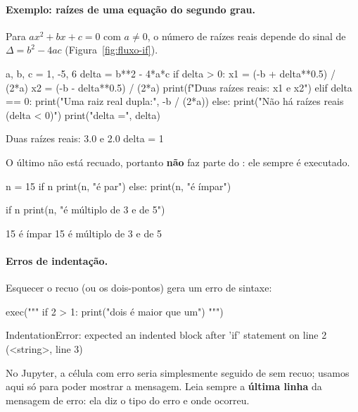 {{\paragraph{Exemplo: raízes de uma equação do segundo grau.} Para $ax^2+bx+c=0$ com $a\neq 0$, o número de raízes
reais depende do sinal de $\Delta=b^2-4ac$ (Figura~\ref{fig:fluxo-if}).

\begin{entrada}
a, b, c = 1, -5, 6
delta = b**2 - 4*a*c
if delta > 0:
    x1 = (-b + delta**0.5) / (2*a)
    x2 = (-b - delta**0.5) / (2*a)
    print(f"Duas raízes reais: {x1} e {x2}")
elif delta == 0:
    print("Uma raiz real dupla:", -b / (2*a))
else:
    print("Não há raízes reais (delta < 0)")
print("delta =", delta)
\end{entrada}
\begin{saida}
Duas raízes reais: 3.0 e 2.0
delta = 1
\end{saida}

O último  não está recuado, portanto \textbf{não} faz parte do : ele sempre é executado.

\begin{entrada}
n = 15
if n %
    print(n, "é par")
else:
    print(n, "é ímpar")

if n %
    print(n, "é múltiplo de 3 e de 5")
\end{entrada}
\begin{saida}
15 é ímpar
15 é múltiplo de 3 e de 5
\end{saida}

\paragraph{Erros de indentação.} Esquecer o recuo (ou os dois-pontos) gera um erro de sintaxe:

\begin{entrada}
exec("""
if 2 > 1:
print("dois é maior que um")
""")
\end{entrada}
\begin{saida}
IndentationError: expected an indented block after 'if' statement on line 2 (<string>, line 3)
\end{saida}

\begin{observacao}
No Jupyter, a célula com erro seria simplesmente
 seguido de  sem recuo; usamos  aqui só para poder mostrar a mensagem.
Leia sempre a \textbf{última linha} da mensagem de erro: ela diz o tipo do erro e onde ocorreu.
\end{observacao}

}}
